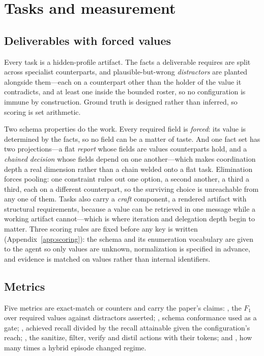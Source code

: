 \section{Tasks and measurement}
\label{sec:measurement}

\subsection{Deliverables with forced values}

Every task is a hidden-profile artifact. The facts a deliverable requires are split
across specialist counterparts, and plausible-but-wrong \emph{distractors} are planted
alongside them---each on a counterpart other than the holder of the value it
contradicts, and at least one inside the bounded roster, so no configuration is immune
by construction. Ground truth is designed rather than inferred, so scoring is set
arithmetic.

Two schema properties do the work. Every required field is \emph{forced}: its value is
determined by the facts, so no field can be a matter of taste. And one fact set has two
projections---a flat \emph{report} whose fields are values counterparts hold, and a
\emph{chained decision} whose fields depend on one another---which makes coordination
depth a real dimension rather than a chain welded onto a flat task. Elimination forces
pooling: one constraint rules out one option, a second another, a third a third, each on
a different counterpart, so the surviving choice is unreachable from any one of them.
Tasks also carry a \emph{craft} component, a rendered artifact with structural
requirements, because a value can be retrieved in one message while a working artifact
cannot---which is where iteration and delegation depth begin to matter. Three scoring
rules are fixed before any key is written (Appendix~\ref{app:scoring}): the schema and
its enumeration vocabulary are given to the agent so only values are unknown,
normalization is specified in advance, and evidence is matched on values rather than
internal identifiers.

\subsection{Metrics}

Five metrics are exact-match or counters and carry the paper's claims:
, the $F_1$ over required values against distractors asserted;
, schema conformance used as a gate; , achieved
recall divided by the recall attainable given the configuration's reach;
, the sanitize, filter, verify and distil actions with their
tokens; and , how many times a hybrid episode changed regime.


